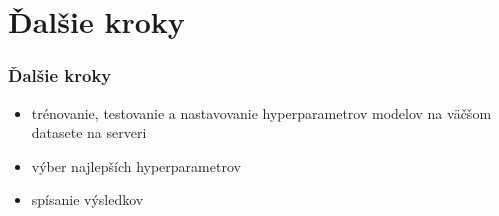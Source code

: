 \documentclass[slovak]{beamer}
\begin{document}
\section{Ďalšie kroky}
 
\begin{frame}
	\frametitle{Ďalšie kroky}
	\begin{itemize}
		\item<1> trénovanie, testovanie a nastavovanie hyperparametrov modelov na väčšom datasete na serveri 
		\item<1> výber najlepších hyperparametrov
		\item<1> spísanie výsledkov
	\end{itemize}
\end{frame}
\end{document}

